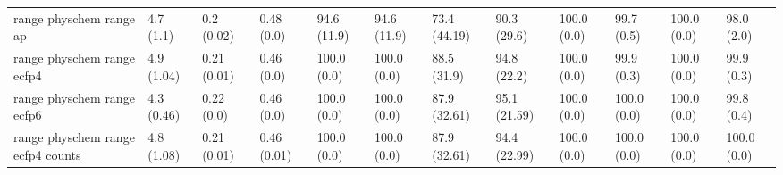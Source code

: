 \begin{tabular}{llllllllllll}
range physchem range ap & {\cellcolor[HTML]{F0F9FB}} \color[HTML]{000000} 4.7 (1.1) & {\cellcolor[HTML]{E1F4F6}} \color[HTML]{000000} 0.2 (0.02) & {\cellcolor[HTML]{70C6AC}} \color[HTML]{000000} 0.48 (0.0) & {\cellcolor[HTML]{005522}} \color[HTML]{F1F1F1} 94.6 (11.9) & {\cellcolor[HTML]{005522}} \color[HTML]{F1F1F1} 94.6 (11.9) & {\cellcolor[HTML]{27904C}} \color[HTML]{F1F1F1} 73.4 (44.19) & {\cellcolor[HTML]{006328}} \color[HTML]{F1F1F1} 90.3 (29.6) & {\cellcolor[HTML]{00441B}} \color[HTML]{F1F1F1} 100.0 (0.0) & {\cellcolor[HTML]{00441B}} \color[HTML]{F1F1F1} 99.7 (0.5) & {\cellcolor[HTML]{00441B}} \color[HTML]{F1F1F1} 100.0 (0.0) & {\cellcolor[HTML]{004A1E}} \color[HTML]{F1F1F1} 98.0 (2.0) \\
range physchem range ecfp4 & {\cellcolor[HTML]{F1FAFC}} \color[HTML]{000000} 4.9 (1.04) & {\cellcolor[HTML]{E1F4F6}} \color[HTML]{000000} 0.21 (0.01) & {\cellcolor[HTML]{77C9B0}} \color[HTML]{000000} 0.46 (0.0) & {\cellcolor[HTML]{00441B}} \color[HTML]{F1F1F1} 100.0 (0.0) & {\cellcolor[HTML]{00441B}} \color[HTML]{F1F1F1} 100.0 (0.0) & {\cellcolor[HTML]{00692A}} \color[HTML]{F1F1F1} 88.5 (31.9) & {\cellcolor[HTML]{005522}} \color[HTML]{F1F1F1} 94.8 (22.2) & {\cellcolor[HTML]{00441B}} \color[HTML]{F1F1F1} 100.0 (0.0) & {\cellcolor[HTML]{00441B}} \color[HTML]{F1F1F1} 99.9 (0.3) & {\cellcolor[HTML]{00441B}} \color[HTML]{F1F1F1} 100.0 (0.0) & {\cellcolor[HTML]{00441B}} \color[HTML]{F1F1F1} 99.9 (0.3) \\
range physchem range ecfp6 & {\cellcolor[HTML]{F3FAFC}} \color[HTML]{000000} 4.3 (0.46) & {\cellcolor[HTML]{F0F9FB}} \color[HTML]{000000} 0.22 (0.0) & {\cellcolor[HTML]{77C9B0}} \color[HTML]{000000} 0.46 (0.0) & {\cellcolor[HTML]{00441B}} \color[HTML]{F1F1F1} 100.0 (0.0) & {\cellcolor[HTML]{00441B}} \color[HTML]{F1F1F1} 100.0 (0.0) & {\cellcolor[HTML]{006B2B}} \color[HTML]{F1F1F1} 87.9 (32.61) & {\cellcolor[HTML]{005321}} \color[HTML]{F1F1F1} 95.1 (21.59) & {\cellcolor[HTML]{00441B}} \color[HTML]{F1F1F1} 100.0 (0.0) & {\cellcolor[HTML]{00441B}} \color[HTML]{F1F1F1} 100.0 (0.0) & {\cellcolor[HTML]{00441B}} \color[HTML]{F1F1F1} 100.0 (0.0) & {\cellcolor[HTML]{00441B}} \color[HTML]{F1F1F1} 99.8 (0.4) \\
range physchem range ecfp4 counts & {\cellcolor[HTML]{F0F9FB}} \color[HTML]{000000} 4.8 (1.08) & {\cellcolor[HTML]{E0F3F5}} \color[HTML]{000000} 0.21 (0.01) & {\cellcolor[HTML]{75C9AF}} \color[HTML]{000000} 0.46 (0.01) & {\cellcolor[HTML]{00441B}} \color[HTML]{F1F1F1} 100.0 (0.0) & {\cellcolor[HTML]{00441B}} \color[HTML]{F1F1F1} 100.0 (0.0) & {\cellcolor[HTML]{006B2B}} \color[HTML]{F1F1F1} 87.9 (32.61) & {\cellcolor[HTML]{005622}} \color[HTML]{F1F1F1} 94.4 (22.99) & {\cellcolor[HTML]{00441B}} \color[HTML]{F1F1F1} 100.0 (0.0) & {\cellcolor[HTML]{00441B}} \color[HTML]{F1F1F1} 100.0 (0.0) & {\cellcolor[HTML]{00441B}} \color[HTML]{F1F1F1} 100.0 (0.0) & {\cellcolor[HTML]{00441B}} \color[HTML]{F1F1F1} 100.0 (0.0) \\

\end{tabular}
